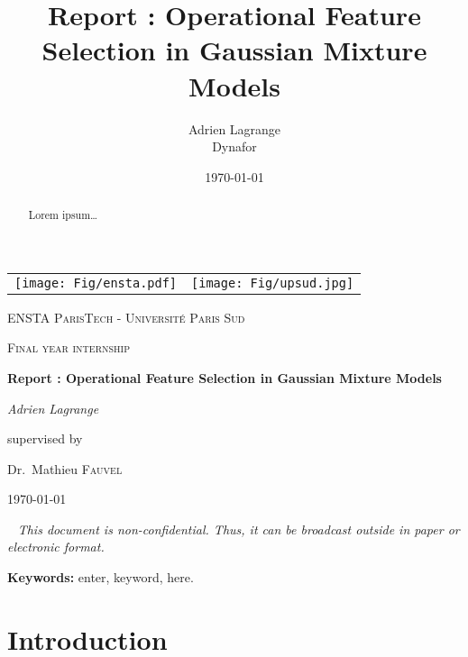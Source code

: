 \documentclass[a4paper,11pt,DIV=16]{scrartcl}
\title{Report : Operational Feature Selection in Gaussian Mixture Models}
\author{Adrien Lagrange
\\
\small{Dynafor}}
\date{\today}
\newcommand\blankpage{%
    \null
    \thispagestyle{empty}%
    \newpage}
\begin{document}

\begin{titlepage}
    \centering
    \begin{tabular}{cc}
        \texttt{[image: Fig/ensta.pdf]}\par\vspace{1cm} &
        \texttt{[image: Fig/upsud.jpg]}\par\vspace{1cm} \\
    \end{tabular}

    {\scshape\LARGE ENSTA ParisTech - Université Paris Sud \par}
    \vspace{1cm}
    {\scshape\Large Final year internship\par}
    \vspace{1.5cm}
    {\huge\bfseries Report : Operational Feature Selection in Gaussian Mixture Models\par}
    \vspace{2cm}
    {\Large\itshape Adrien Lagrange\par}
    \vfill
    supervised by\par
    Dr.~Mathieu \textsc{Fauvel}

    \vfill

    {\large \today\par}

\end{titlepage}

\thispagestyle{empty}
\mbox{~}
\vfill
{\color{red}\Large\itshape This document is non-confidential. Thus, it can be broadcast outside in paper or electronic format.}
\newpage

\begin{abstract}
Lorem ipsum\ldots
\end{abstract}
{\bf Keywords:} enter, keyword, here.
\newpage

\tableofcontents
\newpage

\listoffigures
\newpage

\section{Introduction}
\end{document}
